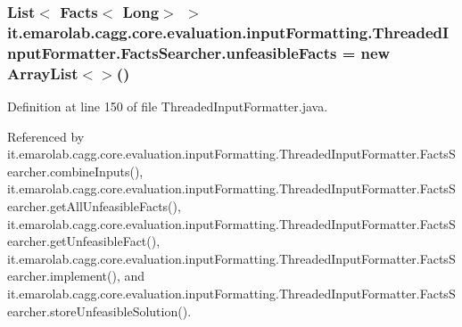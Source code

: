 \hypertarget{classit_1_1emarolab_1_1cagg_1_1core_1_1evaluation_1_1inputFormatting_1_1ThreadedInputFormatter_1_1FactsSearcher_adfd75c85dd66bbf7af0d1e2c690a1aab}{
\subsubsection[{unfeasible\-Facts}]{\setlength{\rightskip}{0pt plus 5cm}List$<$ Facts$<$ Long$>$ $>$ it.\-emarolab.\-cagg.\-core.\-evaluation.\-input\-Formatting.\-Threaded\-Input\-Formatter.\-Facts\-Searcher.\-unfeasible\-Facts = new Array\-List$<$$>$()\hspace{0.3cm}{\ttfamily [private]}}}\label{classit_1_1emarolab_1_1cagg_1_1core_1_1evaluation_1_1inputFormatting_1_1ThreadedInputFormatter_1_1FactsSearcher_adfd75c85dd66bbf7af0d1e2c690a1aab}


Definition at line 150 of file Threaded\-Input\-Formatter.\-java.



Referenced by it.\-emarolab.\-cagg.\-core.\-evaluation.\-input\-Formatting.\-Threaded\-Input\-Formatter.\-Facts\-Searcher.\-combine\-Inputs(), it.\-emarolab.\-cagg.\-core.\-evaluation.\-input\-Formatting.\-Threaded\-Input\-Formatter.\-Facts\-Searcher.\-get\-All\-Unfeasible\-Facts(), it.\-emarolab.\-cagg.\-core.\-evaluation.\-input\-Formatting.\-Threaded\-Input\-Formatter.\-Facts\-Searcher.\-get\-Unfeasible\-Fact(), it.\-emarolab.\-cagg.\-core.\-evaluation.\-input\-Formatting.\-Threaded\-Input\-Formatter.\-Facts\-Searcher.\-implement(), and it.\-emarolab.\-cagg.\-core.\-evaluation.\-input\-Formatting.\-Threaded\-Input\-Formatter.\-Facts\-Searcher.\-store\-Unfeasible\-Solution().

